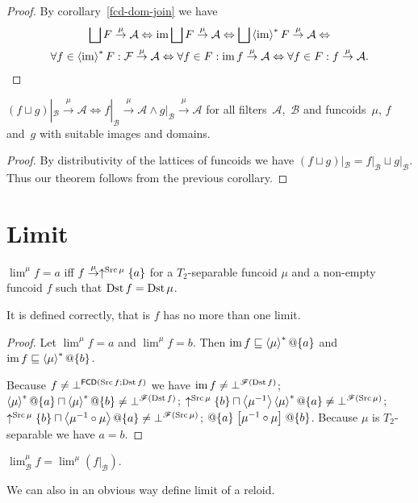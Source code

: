 \begin{proof}
By corollary~\ref{fcd-dom-join} we have
\begin{multline*}
\bigsqcup F\overset{\mu}{\rightarrow}\mathcal{A} \Leftrightarrow \im\bigsqcup F\overset{\mu}{\rightarrow}\mathcal{A} \Leftrightarrow
\bigsqcup\rsupfun{\im}F\overset{\mu}{\rightarrow}\mathcal{A} \Leftrightarrow \\
\forall f\in\rsupfun{\im}F:\mathcal{F}\overset{\mu}{\rightarrow}\mathcal{A} \Leftrightarrow
\forall f\in F:\im f\overset{\mu}{\rightarrow}\mathcal{A} \Leftrightarrow
\forall f\in F:f\overset{\mu}{\rightarrow}\mathcal{A}.
\end{multline*}
\end{proof}

\begin{thm}
$(f\sqcup g)|_{\mathcal{B}}\overset{\mu}{\rightarrow}\mathcal{A} \Leftrightarrow
f|_{\mathcal{B}}\overset{\mu}{\rightarrow}\mathcal{A} \land g|_{\mathcal{B}}\overset{\mu}{\rightarrow}\mathcal{A}$
for all filters~$\mathcal{A}$,~$\mathcal{B}$ and funcoids~$\mu$, $f$ and~$g$ with suitable images and domains.
\end{thm}

\begin{proof}
By distributivity of the lattices of funcoids we have
$(f\sqcup g)|_{\mathcal{B}} = f|_{\mathcal{B}}\sqcup g|_{\mathcal{B}}$.
Thus our theorem follows from the previous corollary.
\end{proof}

\section{Limit}
\begin{defn}
$\lim^{\mu}f=a$ iff $f\overset{\mu}{\rightarrow}\uparrow^{\operatorname{Src}\mu}\{a\}$
for a $T_{2}$-separable funcoid $\mu$ and a non-empty funcoid $f$
such that $\operatorname{Dst} f=\operatorname{Dst}\mu$.
\end{defn}
It is defined correctly, that is $f$ has no more than one limit.
\begin{proof}
Let $\lim^{\mu}f=a$ and $\lim^{\mu}f=b$. Then $\operatorname{im} f\sqsubseteq\left\langle \mu\right\rangle ^{\ast}@\{a\}$
and $\operatorname{im} f\sqsubseteq\left\langle \mu\right\rangle ^{\ast}@\{b\}$.

Because $f\ne\bot^{\mathsf{FCD}(\operatorname{Src} f;\operatorname{Dst} f)}$ we have $\operatorname{im} f\ne\bot^{\mathscr{F}(\operatorname{Dst} f)}$;
$\left\langle \mu\right\rangle ^{\ast}@\{a\}\sqcap\left\langle \mu\right\rangle ^{\ast}@\{b\}\ne\bot^{\mathscr{F}(\operatorname{Dst} f)}$;
$\uparrow^{\operatorname{Src}\mu}\{b\}\sqcap\left\langle \mu^{-1}\right\rangle\left\langle \mu\right\rangle ^{\ast}@\{a\}\ne\bot^{\mathscr{F}(\operatorname{Src}\mu)}$;
$\uparrow^{\Src\mu}\{b\}\sqcap\supfun{\mu^{-1}\circ\mu}@\{a\}\ne\bot^{\mathscr{F}(\Src\mu)}$;
$@\{a\}\mathrel{\left[\mu^{-1}\circ\mu\right]}@\{b\}$.
Because $\mu$ is $T_{2}$-separable we have $a=b$.\end{proof}
\begin{defn}
$\lim_{\mathcal{B}}^{\mu}f=\lim^{\mu}(f|_{\mathcal{B}})$.\end{defn}
\begin{rem}
We can also in an obvious way define limit of a reloid.
\end{rem}

